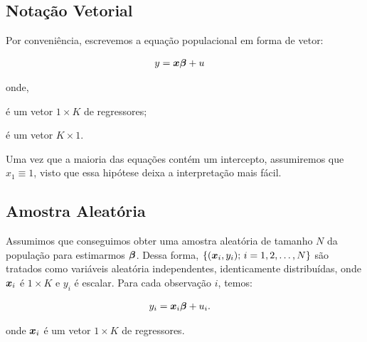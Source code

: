 \documentclass[11pt, oneside, a4paper, article]{article}
\numberwithin{equation}{section}
\begin{document}
\subsection*{Notação Vetorial} 
\noindent
\citet[Sec. 4.2 -- Asymptotic Properties of OLS; p.51]{wool-2010}

Por conveniência, escrevemos a equação populacional em forma de vetor:

\vspace{-1 em}
\begin{align} \label{ols:mod:vec}
	y &= \boldsymbol{x} \boldsymbol{\beta} + u
\end{align}

\noindent
onde,

\vspace{-1 em}
\begin{description}[noitemsep]
\item [$\xvec \equiv (x_{1}, \dots, x_{K})$] é um vetor $1 \times K$ de regressores;

\item [$\betavec \equiv (\beta_{1}, \dots, \beta_{K})'$] é um vetor $K \times 1$.
\end{description}

\noindent
Uma vez que a maioria das equações contém um intercepto, assumiremos que $x_{1} \equiv 1$, visto que essa hipótese deixa a interpretação mais fácil.

\subsection*{Amostra Aleatória} 

Assumimos que conseguimos obter uma amostra aleatória de tamanho $N$ da população para estimarmos $\boldsymbol{\beta}$.
Dessa forma, $\{ (\boldsymbol{x}_{i}, y_{i}); \, i = 1, 2, \dots, N \}$
são tratados como variáveis aleatória independentes, identicamente distribuídas, onde
$\boldsymbol{x}_{i}$ é $1 \times K$ e $y_{i}$ é escalar.
Para cada observação $i$, temos:

\vspace{-1 em}
\begin{align} \label{ols:mod:vec:i}
	y_{i} &= \boldsymbol{x}_{i} \boldsymbol{\beta} + u_{i}.
\end{align}

\noindent
onde
$\boldsymbol{x}_{i}$
é um vetor $1 \times K$ de regressores.

\end{document}
